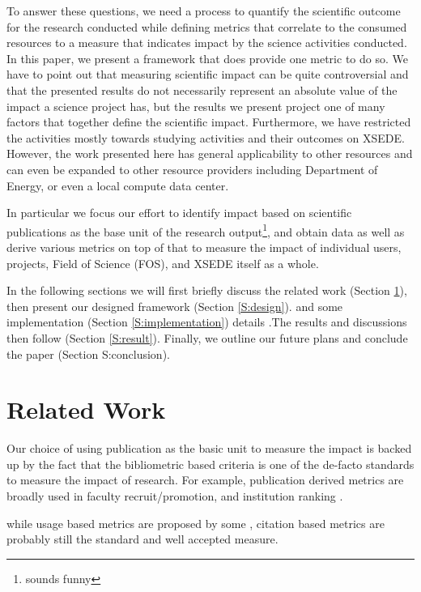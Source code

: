 \documentclass{sig-alternate}
\begin{document}
To answer these questions, we need a process to quantify the scientific outcome for the research conducted while defining metrics that correlate to the consumed resources to a measure that indicates impact by the science activities conducted. In this paper, we present a framework that does provide one metric to do so. We have to point out that measuring scientific impact can be quite controversial and that the presented results do not necessarily represent an absolute value of the impact a science project has, but the results we present project one of many factors that together define the scientific impact.
Furthermore, we have restricted the activities mostly towards studying activities and their outcomes on XSEDE. However, the work presented here has general applicability to other resources and can even be expanded to other resource providers including Department of Energy, or even a local compute data center.


In particular we focus our effort to identify impact based on scientific publications as the base unit of the research output\footnote{sounds funny}, and obtain data as well as derive various metrics on top of that to measure the impact of individual users, projects, Field of Science (FOS), and XSEDE itself as a whole. 
 
In the following sections we will first briefly discuss the related work (Section \ref{S:related}), then present our designed framework (Section \ref{S:design}). and some implementation (Section \ref{S:implementation}) details .The results and discussions then follow (Section \ref{S:result}). Finally, we outline our future plans and conclude the paper (Section {S:conclusion}). 
 
 
 
\section{Related Work} \label{S:related}
 
Our choice of using publication as the basic unit to measure the impact is backed up by the fact that the bibliometric based criteria is one of the de-facto standards to measure the impact of research. For example, publication derived metrics are broadly used in faculty recruit/promotion, and institution ranking \cite{thomas1998institutional}. 
 
while usage based metrics are proposed by some \cite{Bollen:2007:MUM:1255175.1255273,Bollen:2008:TUI:1378889.1378928, bollen2009principal}, citation based metrics are probably still the standard and well accepted measure. 
\end{document}
